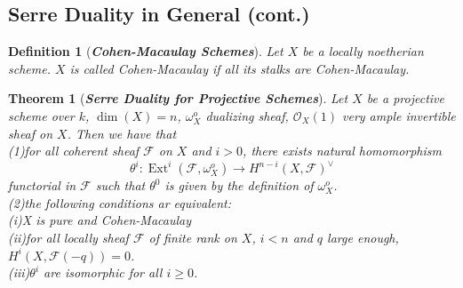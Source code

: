 \documentclass{ctexart}
\newtheorem{definition}{Definition}[section]
\newtheorem{theorem}{Theorem}[section]
\newcommand{\ext}{\operatorname{Ext}}
\begin{document}
\subsection{Serre Duality in General (cont.)}
\begin{definition}[\textbf{\emph{Cohen-Macaulay Schemes}}]
    Let $X$ be a locally noetherian scheme.
    $X$ is called Cohen-Macaulay if all its stalks are Cohen-Macaulay.
\end{definition}
\begin{theorem}[\textbf{\emph{Serre Duality for Projective Schemes}}]
    Let $X$ be a projective scheme over $k$, $\dim(X) = n$, $\omega_{X}^{o}$ dualizing sheaf, $\mathcal{O}_{X}(1)$ very ample invertible sheaf on $X$.
    Then we have that \\
    (1)for all coherent sheaf $\mathcal{F}$ on $X$ and $i > 0$, there exists natural homomorphism
    \begin{equation*}
        \theta^{i}: \ext^{i}(\mathcal{F}, \omega_{X}^{o}) \longrightarrow H^{n - i}(X, \mathcal{F})^{\lor} 
    \end{equation*}
    functorial in $\mathcal{F}$ such that $\theta^{0}$ is given by the definition of $\omega_{X}^{o}$. \\
    (2)the following conditions ar equivalent: \\
    (i)X is pure and Cohen-Macaulay \\
    (ii)for all locally sheaf $\mathcal{F}$ of finite rank on $X$, $i < n$ and $q$ large enough, $H^{i}(X, \mathcal{F}(-q)) = 0$. \\
    (iii)$\theta^{i}$ are isomorphic for all $i \ge 0$.
    \label{Theorem 11.3}
\end{theorem}
\end{document}
